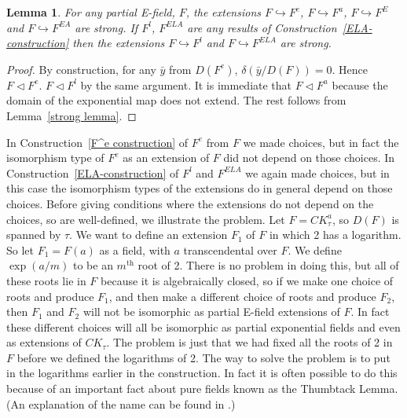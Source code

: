 \documentclass[12pt]{amsart}
\newtheorem{lemma}[prop]{Lemma}
\theoremstyle{definition}
\begin{document}
\begin{lemma}\label{F strong in F^ELA}
  For any partial E-field, $F$, the extensions $F {\hookrightarrow} F^e$, $F {\hookrightarrow}
  F^a$, $F {\hookrightarrow} F^E$ and $F {\hookrightarrow} F^{EA}$ are strong. If $F^l$,
  $F^{ELA}$ are any results of Construction~\ref{ELA-construction}
  then the extensions $F {\hookrightarrow} F^l$ and $F {\hookrightarrow} F^{ELA}$ are strong.
\end{lemma}
\begin{proof}
  By construction, for any $\bar{y}$ from $D(F^e)$,
  $\delta(\bar{y}/D(F)) = 0$. Hence $F {\ensuremath{\lhd}} F^e$. $F {\ensuremath{\lhd}} F^l$ by the same argument. It is immediate that $F {\ensuremath{\lhd}} F^a$ because the domain of the exponential map does not extend. The rest follows from Lemma~\ref{strong lemma}.
\end{proof}

In Construction~\ref{F^e construction} of $F^e$ from $F$ we made choices, but in fact the isomorphism type of $F^e$ as an extension of $F$ did not depend on those choices. 
In Construction~\ref{ELA-construction} of $F^l$ and $F^{ELA}$ we again made choices, but in this case the isomorphism types of the extensions do in general depend on those choices. Before giving conditions where the extensions do not depend on the choices, so are well-defined, we illustrate the problem.
 Let $F = CK_\tau^a$, so $D(F)$ is spanned by $\tau$. We want to
 define an extension $F_1$ of $F$ in which 2 has a logarithm. So let
 $F_1 = F(a)$ as a field, with $a$ transcendental over $F$. We define
 $\exp(a/m)$ to be an $m^{\mathrm{th}}$ root of 2. There is no problem
 in doing this, but all of these roots lie in $F$ because it is algebraically closed, so if we make one
 choice of roots and produce $F_1$, and then make a different choice
 of roots and produce $F_2$, then $F_1$ and $F_2$ will not be
 isomorphic as partial E-field extensions of $F$. In fact these
 different choices will all be isomorphic as partial exponential
 fields and even as extensions of $CK_\tau$. The problem is just that
 we had fixed all the roots of 2 in $F$ before we defined the
 logarithms of 2. The way to solve the problem is to put in the
 logarithms earlier in the construction. In fact it is often possible
 to do this because of an important fact about pure fields known as the Thumbtack Lemma. (An explanation of the name can be found in \cite[p19]{Baldwin_Categoricity}.)
\end{document}
